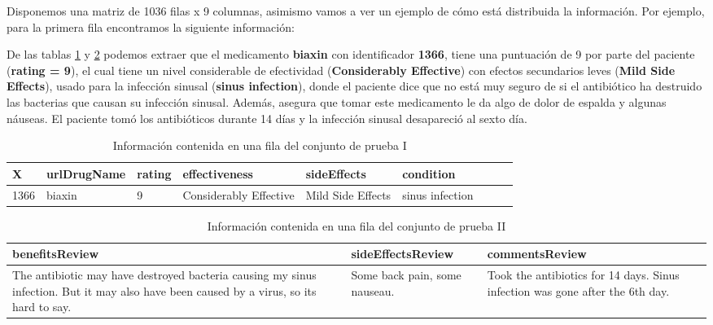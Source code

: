 \documentclass[spanish,]{article}
\begin{document}
Disponemos una matriz de 1036 filas x 9 columnas, asimismo vamos a ver
un ejemplo de cómo está distribuida la información. Por ejemplo, para la
primera fila encontramos la siguiente información:

De las tablas \ref{tabla:datos_testI} y \ref{tabla:datos_testII} podemos
extraer que el medicamento \textbf{biaxin} con identificador
\textbf{1366}, tiene una puntuación de 9 por parte del paciente
(\textbf{rating = 9}), el cual tiene un nivel considerable de
efectividad (\textbf{Considerably Effective}) con efectos secundarios
leves (\textbf{Mild Side Effects}), usado para la infección sinusal
(\textbf{sinus infection}), donde el paciente dice que no está muy
seguro de si el antibiótico ha destruido las bacterias que causan su
infección sinusal. Además, asegura que tomar este medicamento le da algo
de dolor de espalda y algunas náuseas. El paciente tomó los antibióticos
durante 14 días y la infección sinusal desapareció al sexto día.

\begin{table}[h]
  \centering
    \begin{tabular}{|l|l|l|l|l|l|l|l|l|}
      \hline
      \rowcolor[rgb]{0.94,0.97,1.0} \textbf{X} & \textbf{urlDrugName} & \textbf{rating} & \textbf{effectiveness} 
      & \textbf{sideEffects} &\textbf{condition} \\ \hline
      1366 & biaxin & 9 & Considerably Effective & Mild Side Effects & sinus infection  \\ \hline
    \end{tabular}
  \caption{Información contenida en una fila del conjunto de prueba I}
  \label{tabla:datos_testI}
\end{table}

\begin{table}[h]
  \centering
    \begin{tabular}{|m{7cm}|m{3cm}|m{5cm}|}
      \hline
      \rowcolor[rgb]{0.94,0.97,1.0} \textbf{benefitsReview} & \textbf{sideEffectsReview} & \textbf{commentsReview} \\ \hline
      The antibiotic may have destroyed bacteria causing my sinus infection. But it may also have been caused by a virus, so its hard to say. & Some back pain, some nauseau. & Took the antibiotics for 14 days. Sinus infection was gone after the 6th day. \\ \hline
    \end{tabular}
  \caption{Información contenida en una fila del conjunto de prueba II}
  \label{tabla:datos_testII}
\end{table}
\end{document}
